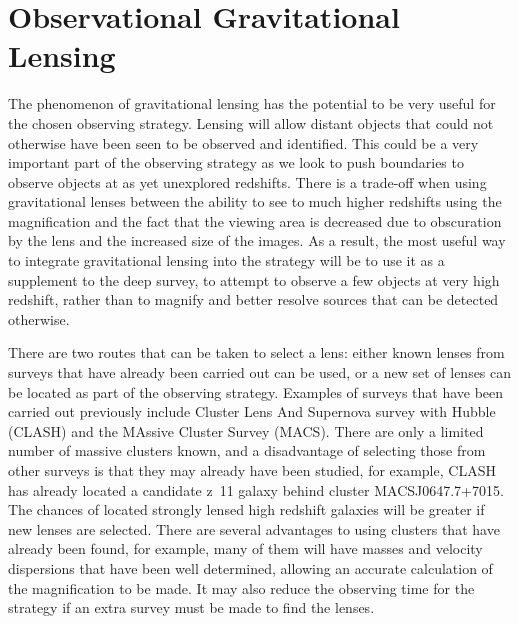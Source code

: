 
\section{Observational Gravitational Lensing} %
\label{sec:observational_gravitational_lensing}
	The phenomenon of gravitational lensing has the potential to be very useful for the chosen observing strategy. Lensing will allow distant objects that could not otherwise have been seen to be observed and identified.  This could be a very important part of the observing strategy as we look to push boundaries to observe objects at as yet unexplored redshifts. There is a trade-off when using gravitational lenses between the ability to see to much higher redshifts using the magnification and the fact that the viewing area is decreased due to obscuration by the lens and the increased size of the images. As a result, the most useful way to integrate gravitational lensing into the strategy will be to use it as a supplement to the deep survey, to attempt to observe a few objects at very high redshift, rather than to magnify and better resolve sources that can be detected otherwise.

	There are two routes that can be taken to select a lens: either known lenses from surveys that have already been carried out can be used, or a new set of lenses can be located as part of the observing strategy. Examples of surveys that have been carried out previously include Cluster Lens And Supernova survey with Hubble (CLASH)\cite{CLASH} and the MAssive Cluster Survey (MACS)\cite{MACS}. There are only a limited number of massive clusters known, and a disadvantage of selecting those from other surveys is that they may already have been studied, for example, CLASH has already located a candidate z~11 galaxy behind cluster MACSJ0647.7+7015\cite{CLASH_z11_candidate}. The chances of located strongly lensed high redshift galaxies will be greater if new lenses are selected. There are several advantages to using clusters that have already been found, for example, many of them will have masses and velocity dispersions that have been well determined, allowing an accurate calculation of the magnification to be made. It may also reduce the observing time for the strategy if an extra survey must be made to find the lenses. 

